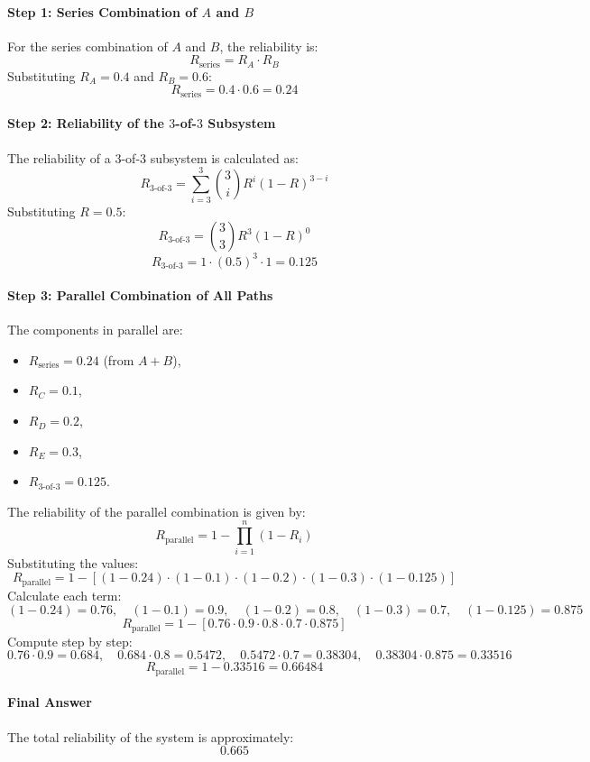 \documentclass[12pt	]{article}
\begin{document}
\paragraph{Step 1: Series Combination of $A$ and $B$}
For the series combination of $A$ and $B$, the reliability is:
\[
R_{\text{series}} = R_A \cdot R_B
\]
Substituting $R_A = 0.4$ and $R_B = 0.6$:
\[
R_{\text{series}} = 0.4 \cdot 0.6 = 0.24
\]

\paragraph{Step 2: Reliability of the $3$-of-$3$ Subsystem}
The reliability of a $3$-of-$3$ subsystem is calculated as:
\[
R_{3\text{-of-}3} = \sum_{i=3}^3 \binom{3}{i} R^i (1 - R)^{3-i}
\]
Substituting $R = 0.5$:
\[
R_{3\text{-of-}3} = \binom{3}{3} R^3 (1 - R)^0
\]
\[
R_{3\text{-of-}3} = 1 \cdot (0.5)^3 \cdot 1 = 0.125
\]

\paragraph{Step 3: Parallel Combination of All Paths}
The components in parallel are:
\begin{itemize}
	\item $R_{\text{series}} = 0.24$ (from $A + B$),
	\item $R_C = 0.1$,
	\item $R_D = 0.2$,
	\item $R_E = 0.3$,
	\item $R_{3\text{-of-}3} = 0.125$.
\end{itemize}
The reliability of the parallel combination is given by:
\[
R_{\text{parallel}} = 1 - \prod_{i=1}^n (1 - R_i)
\]
Substituting the values:
\[
R_{\text{parallel}} = 1 - \left[(1 - 0.24) \cdot (1 - 0.1) \cdot (1 - 0.2) \cdot (1 - 0.3) \cdot (1 - 0.125)\right]
\]
Calculate each term:
\[
(1 - 0.24) = 0.76, \quad (1 - 0.1) = 0.9, \quad (1 - 0.2) = 0.8, \quad (1 - 0.3) = 0.7, \quad (1 - 0.125) = 0.875
\]
\[
R_{\text{parallel}} = 1 - \left[0.76 \cdot 0.9 \cdot 0.8 \cdot 0.7 \cdot 0.875\right]
\]
Compute step by step:
\[
0.76 \cdot 0.9 = 0.684, \quad 0.684 \cdot 0.8 = 0.5472, \quad 0.5472 \cdot 0.7 = 0.38304, \quad 0.38304 \cdot 0.875 = 0.33516
\]
\[
R_{\text{parallel}} = 1 - 0.33516 = 0.66484
\]

\paragraph{Final Answer}
The total reliability of the system is approximately:
\[
\boxed{0.665}
\]
\end{document}
